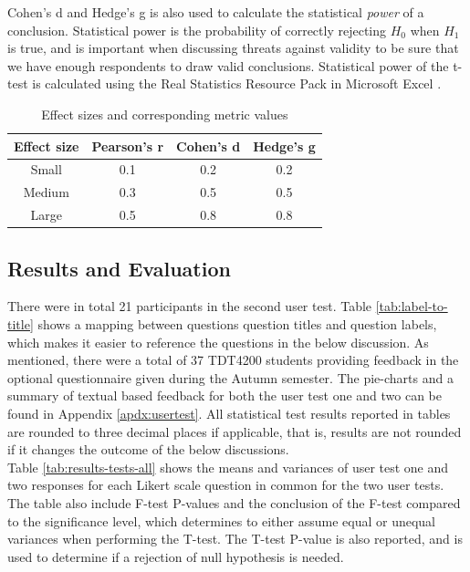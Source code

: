 Cohen's d and Hedge's g is also used to calculate the statistical \textit{power} of a conclusion. Statistical power is the probability of correctly rejecting $H_0$ when $H_1$ is true, and is important when discussing threats against validity to be sure that we have enough respondents to draw valid conclusions. Statistical power of the t-test is calculated using the Real Statistics Resource Pack in Microsoft Excel \cite{RSRP}.

\begin{table}[t!]
    \centering
    \begin{tabular}{ | c | c | c | c |}
    \hline
    \textbf{Effect size} & \textbf{Pearson's r} & \textbf{Cohen's d} & \textbf{Hedge's g} \\ \hline
    Small & 0.1 & 0.2 & 0.2 \\ \hline
    Medium & 0.3 & 0.5 & 0.5 \\ \hline
    Large & 0.5 & 0.8 & 0.8 \\ \hline
    \end{tabular}
    \caption{Effect sizes and corresponding metric values}
    \label{tab:effect-size}
\end{table}

\subsection{Results and Evaluation}
\label{sub-sec:user-testing-results}
There were in total 21 participants in the second user test. Table \ref{tab:label-to-title} shows a mapping between questions question titles and question labels, which makes it easier to reference the questions in the below discussion. As mentioned, there were a total of 37 TDT4200 students providing feedback in the optional questionnaire given during the Autumn semester. The pie-charts and a summary of textual based feedback for both the user test one and two can be found in Appendix \ref{apdx:usertest}. All statistical test results reported in tables are rounded to three decimal places if applicable, that is, results are not rounded if it changes the outcome of the below discussions. \\

Table \ref{tab:results-tests-all} shows the means and variances of user test one and two responses for each Likert scale question in common for the two user tests. The table also include F-test P-values and the conclusion of the F-test compared to the significance level, which determines to either assume equal or unequal variances when performing the T-test. The T-test P-value is also reported, and is used to determine if a rejection of null hypothesis is needed. \\

